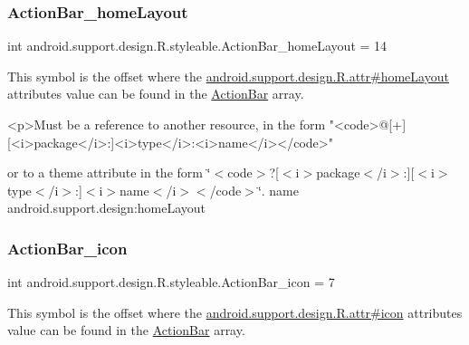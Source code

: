 \subsubsection{\texorpdfstring{Action\+Bar\+\_\+home\+Layout}{ActionBar\_homeLayout}}
{\footnotesize\ttfamily int android.\+support.\+design.\+R.\+styleable.\+Action\+Bar\+\_\+home\+Layout = 14\hspace{0.3cm}{\ttfamily [static]}}

This symbol is the offset where the \hyperlink{classandroid_1_1support_1_1design_1_1R_1_1attr_a4e4911b093d74cb70c4440363410110e}{android.\+support.\+design.\+R.\+attr\#home\+Layout} attribute\textquotesingle{}s value can be found in the \hyperlink{classandroid_1_1support_1_1design_1_1R_1_1styleable_ab795220a96557d11f8c21359b95bed82}{Action\+Bar} array.

\begin{DoxyVerb}      <p>Must be a reference to another resource, in the form "<code>@[+][<i>package</i>:]<i>type</i>:<i>name</i></code>"
\end{DoxyVerb}
 or to a theme attribute in the form \char`\"{}$<$code$>$?\mbox{[}$<$i$>$package$<$/i$>$\+:\mbox{]}\mbox{[}$<$i$>$type$<$/i$>$\+:\mbox{]}$<$i$>$name$<$/i$>$$<$/code$>$\char`\"{}.  name android.\+support.\+design\+:home\+Layout \mbox{\label{classandroid_1_1support_1_1design_1_1R_1_1styleable_a356bb80ee476da75d83e098c4ba916e0}} 
\subsubsection{\texorpdfstring{Action\+Bar\+\_\+icon}{ActionBar\_icon}}
{\footnotesize\ttfamily int android.\+support.\+design.\+R.\+styleable.\+Action\+Bar\+\_\+icon = 7\hspace{0.3cm}{\ttfamily [static]}}

This symbol is the offset where the \hyperlink{classandroid_1_1support_1_1design_1_1R_1_1attr_a4f038778976a3c5a21ca334ebe58357d}{android.\+support.\+design.\+R.\+attr\#icon} attribute\textquotesingle{}s value can be found in the \hyperlink{classandroid_1_1support_1_1design_1_1R_1_1styleable_ab795220a96557d11f8c21359b95bed82}{Action\+Bar} array.

